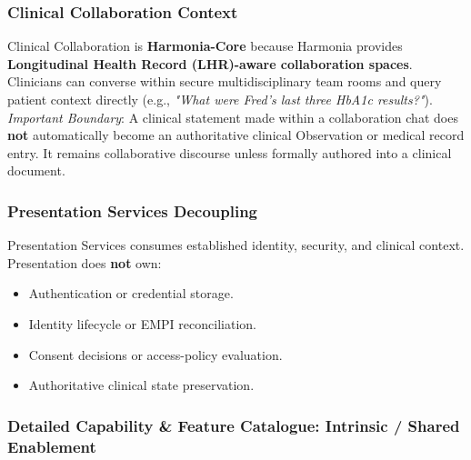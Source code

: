 \subsubsection*{Clinical Collaboration Context}
\label{rad:enabling:594}

Clinical Collaboration is \textbf{Harmonia-Core} because Harmonia provides \textbf{Longitudinal Health Record (LHR)-aware collaboration spaces}. Clinicians can converse within secure multidisciplinary team rooms and query patient context directly (e.g., \emph{"What were Fred's last three HbA1c results?"}). \emph{Important Boundary}: A clinical statement made within a collaboration chat does \textbf{not} automatically become an authoritative clinical Observation or medical record entry. It remains collaborative discourse unless formally authored into a clinical document.

\label{rad:enabling:597}
\subsubsection*{Presentation Services Decoupling}
\label{rad:enabling:598}

Presentation Services consumes established identity, security, and clinical context. Presentation does \textbf{not} own:

\label{rad:enabling:599}

\begin{itemize}

\item
Authentication or credential storage.



\item
Identity lifecycle or EMPI reconciliation.



\item
Consent decisions or access-policy evaluation.



\item
Authoritative clinical state preservation.



\end{itemize}
\label{rad:enabling:604}

\par\smallskip
{}\label{rad:enabling:606}
\subsubsection*{Detailed Capability \& Feature Catalogue: Intrinsic /\allowbreak{} Shared Enablement}
\label{rad:enabling:608}
